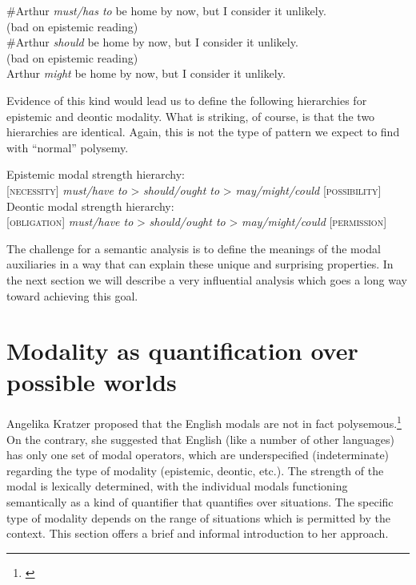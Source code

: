 \ea \label{ex:16.9}
\ea  \#Arthur \textit{must/has to} be home by now, but I consider it unlikely.\\
  (bad on epistemic reading)\\
\ex \#Arthur \textit{should} be home by now, but I consider it unlikely.\\
  (bad on epistemic reading)\\
\ex Arthur \textit{might} be home by now, but I consider it unlikely.
                       \z
\z


Evidence of this kind would lead us to define the following hierarchies for epistemic and deontic modality. What is striking, of course, is that the two hierarchies are identical. Again, this is not the type of pattern we expect to find with “normal” polysemy.


\ea \label{ex:16.10}
\ea Epistemic modal strength hierarchy:\\
{}[\textsc{necessity}]  \textit{must/have to} > \textit{should/ought to} > \textit{may/might/could}  [\textsc{possibility}]
\ex  Deontic modal strength hierarchy:\\
{}[\textsc{obligation}]  \textit{must/have to} > \textit{should/ought to} > \textit{may/might/could}  [\textsc{permission}]
\z \z


The challenge for a semantic analysis is to define the meanings of the modal auxiliaries in a way that can explain these unique and surprising properties. In the next section we will describe a very influential analysis which goes a long way toward achieving this goal.


\section{Modality as quantification over possible worlds}\label{sec:16.3}

Angelika Kratzer proposed that the English modals are not in fact polysemous.\footnote{\citet{Kratzer1981,Kratzer1991}} On the contrary, she suggested that English (like a number of other languages) has only one set of modal operators, which are underspecified (indeterminate) regarding the type of modality (epistemic, deontic, etc.). The strength of the modal is lexically determined, with the individual modals functioning semantically as a kind of quantifier that quantifies over situations. The specific type of modality depends on the range of situations which is permitted by the context. This section offers a brief and informal introduction to her approach.


